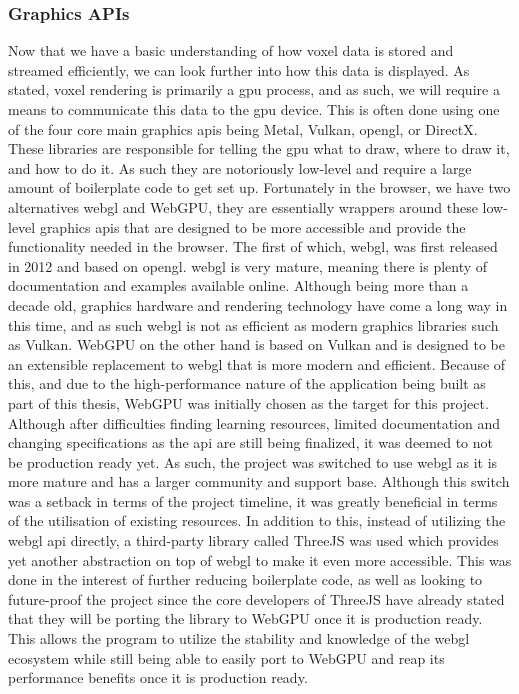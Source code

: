 \documentclass[titlepage]{article}
\begin{document}
\subsubsection{Graphics APIs}
Now that we have a basic understanding of how voxel data is stored and streamed efficiently, we can look further into how this data is displayed. As stated, voxel rendering is primarily a \gls{gpu} process, and as such, we will require a means to communicate this data to the \gls{gpu} device. This is often done using one of the four core main graphics \glspl{api} being Metal, Vulkan, \gls{opengl}, or DirectX. These libraries are responsible for telling the \gls{gpu} what to draw, where to draw it, and how to do it. As such they are notoriously low-level and require a large amount of boilerplate code to get set up. Fortunately in the browser, we have two alternatives \gls{webgl} and WebGPU, they are essentially wrappers around these low-level graphics \glspl{api} that are designed to be more accessible and provide the functionality needed in the browser. The first of which, \gls{webgl}, was first released in 2012 and based on \gls{opengl}. \gls{webgl} is very mature, meaning there is plenty of documentation and examples available online. Although being more than a decade old, graphics hardware and rendering technology have come a long way in this time, and as such \gls{webgl} is not as efficient as modern graphics libraries such as Vulkan. WebGPU on the other hand is based on Vulkan and is designed to be an extensible replacement to \gls{webgl} that is more modern and efficient. Because of this, and due to the high-performance nature of the application being built as part of this thesis, WebGPU was initially chosen as the target for this project. Although after difficulties finding learning resources, limited documentation and changing specifications as the \gls{api} are still being finalized, it was deemed to not be production ready yet. As such, the project was switched to use \gls{webgl} as it is more mature and has a larger community and support base. Although this switch was a setback in terms of the project timeline, it was greatly beneficial in terms of the utilisation of existing resources. In addition to this, instead of utilizing the \gls{webgl} \gls{api} directly, a third-party library called ThreeJS was used which provides yet another abstraction on top of \gls{webgl} to make it even more accessible. This was done in the interest of further reducing boilerplate code, as well as looking to future-proof the project since the core developers of ThreeJS have already stated that they will be porting the library to WebGPU once it is production ready. This allows the program to utilize the stability and knowledge of the \gls{webgl} ecosystem while still being able to easily port to WebGPU and reap its performance benefits once it is production ready.
\end{document}
